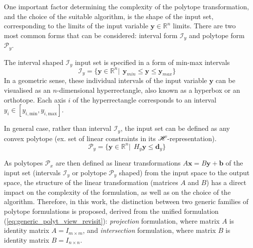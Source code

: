 

One important factor determining the complexity of the polytope transformation, and the choice of the suitable algorithm, is the shape of the input set, corresponding to the limits of the input variable $\bm{y}\in\mathbb{R}^n$ limits. There are two most common forms that can be considered: interval form $\mathcal{I}_y$ and polytope form $\mathcal{P}_y$. 

The interval shaped $\mathcal{I}_y$ input set is specified in a form of min-max intervals
\begin{equation}
    \mathcal{I}_y = \{\bm{y}\in \mathbb{R}^n |~~ \bm{y}_{min} \leq \bm{y}\leq \bm{y}_{max} \}
    \label{eq:hypercube_lim}
\end{equation}
In a geometric sense, these individual intervals of the input variable $\bm{y}$ can be visualised as an $n$-dimensional hyperrectangle, also known as a hyperbox or an orthotope. Each axis $i$ of the hyperrectangle corresponds to an interval $y_i\in[y_{i,\text{min}},y_{i,\text{max}}]$.

In general case, rather than interval $\mathcal{I}_y$, the input set can be defined as any convex polytope (ex. set of linear constraints in its $\mathscr{H}$-representation).
\begin{equation}
    \mathcal{P}_y = \{\bm{y}\in \mathbb{R}^n|~~ H_y\bm{y}\leq \bm{d}_y \}
\end{equation}

As polytopes $\mathcal{P}_x$ are then defined as linear transformations $A\bm{x}\!=\!B\bm{y}\! +\! \bm{b}$ of the input set (intervals $\mathcal{I}_y$ or polytope $\mathcal{P}_y$ shaped) from the input space to the output space, the structure of the linear transformation (matrices $A$ and $B$) has a direct impact on the complexity of the formulation, as well as on the choice of the algorithm.
Therefore, in this work, the distinction between two generic families of polytope formulations is proposed, derived from the unified formulation (\ref{eq:generic_polyt_view_revisit}): \textit{projection} formulation, where matrix $A$ is identity matrix $A=I_{m\times m}$, and \textit{intersection} formulation, where matrix $B$ is identity matrix $B=I_{n\times n}$.

